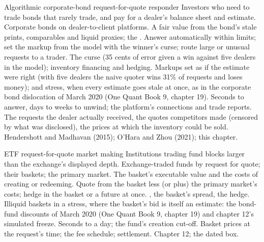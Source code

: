 \begin{strategyfile}{Algorithmic corporate-bond request-for-quote responder}\label{strat:hf:bond-and-etf-request-for-quote-market-making:corp}
 Investors who need to trade bonds that rarely trade, and pay for a dealer's balance sheet and estimate.
 Corporate bonds on dealer-to-client platforms.
 A fair value from the bond's stale prints, comparables and liquid proxies; the .
 Answer automatically within limits; set the markup from the model with the winner's curse; route large or unusual
requests to a trader.
 The curse (35 cents of error given a win against five dealers in the model); inventory financing and hedging.
 Markups set as if the estimate were right (with five dealers the naive quoter wins 31\% of requests and loses money); and
stress, when every estimate goes stale at once, as in the corporate bond dislocation of March 2020 (One Quant Book 9, chapter 19).
 Seconds to answer, days to weeks to unwind; the platform's connections and trade reports.
 The requests the dealer actually received, the quotes competitors made (censored by what was disclosed), the prices at
which the inventory could be sold.
 Hendershott and Madhavan (2015); O'Hara and Zhou (2021); this chapter.
\end{strategyfile}

\begin{strategyfile}{ETF request-for-quote market making}\label{strat:hf:bond-and-etf-request-for-quote-market-making:etf}
 Institutions trading fund blocks larger than the exchange's displayed depth.
 Exchange-traded funds by request for quote; their baskets; the primary market.
 The basket's executable value and the costs of creating or redeeming.
 Quote from the basket less (or plus) the primary market's costs; hedge in the basket or a future at once.
 , the basket's spread, the hedge.
 Illiquid baskets in a stress, where the basket's bid is itself an estimate: the bond-fund discounts of March 2020 (One Quant
Book 9, chapter 19) and chapter 12's simulated freeze.
 Seconds to a day; the fund's creation cut-off.
 Basket prices at the request's time; the fee schedule; settlement.
 Chapter 12; the dated box.
\end{strategyfile}

